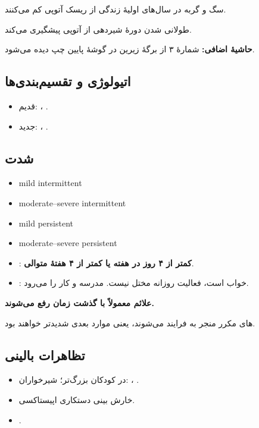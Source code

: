 \documentclass[12pt,a4paper]{article}
\begin{document}
سگ و گربه در سال‌های اولیهٔ زندگی از ریسک آتوپی کم می‌کنند.

طولانی شدن دورهٔ شیردهی از آتوپی پیشگیری می‌کند.

\textbf{حاشیهٔ اضافی:} شمارهٔ ۳ از برگهٔ زیرین در گوشهٔ پایین چپ دیده می‌شود.
\subsection*{اتیولوژی و تقسیم‌بندی‌ها}
\begin{itemize}
\item قدیم:  \lr{\(\longrightarrow\)} ، .
\item جدید:  \lr{\(\longrightarrow\)} \textbf{}، \textbf{}.
\end{itemize}
\subsection*{شدت }
\begin{latin}
\begin{itemize}
\item mild intermittent
\item moderate--severe intermittent
\item mild persistent
\item moderate--severe persistent
\end{itemize}
\end{latin}
\begin{itemize}
\item {}: \textbf{کمتر از ۴ روز در هفته یا کمتر از ۴ هفتهٔ متوالی}.
\item {}: خواب  است، فعالیت روزانه مختل نیست. مدرسه و کار را می‌رود.
\end{itemize}
\textbf{علائم  معمولاً با گذشت زمان رفع می‌شوند.}

های مکرر منجر به فرایند  می‌شوند، یعنی موارد بعدی شدیدتر خواهند بود.
\subsection*{تظاهرات بالینی }
\begin{itemize}
\item {} در کودکان بزرگ‌تر؛ شیرخواران: ، .
\item خارش بینی \lr{\(\longrightarrow\)} دستکاری \lr{\(\longrightarrow\)} اپیستاکسی.
\item {}.
\end{itemize}
\end{document}
